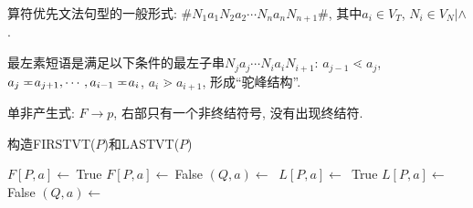                算符优先文法句型的一般形式: $\#N_1a_1N_2a_2\cdots N_na_nN_{n+1}\#$, 其中$a_i\in V_T$, $N_i\in V_N|\wedge$.

                \textsf{最左素短语}是满足以下条件的最左子串$N_ja_j\cdots N_ia_iN_{i+1}$: $a_{j-1}\lessdot a_j$, $a_j=\hskip -.8em\cdot\  a_{j+1}, \cdots, \\a_{i-1}=\hskip -.8em\cdot\  a_i$, $a_i\gtrdot a_{i+1}$, 形成``驼峰结构''.


                \textsf{单非产生式}: $F\to p$, 右部只有一个非终结符号, 没有出现终结符.

            \begin{algorithm}
                \caption{构造FIRSTVT($P$)和LASTVT($P$)}
                \label{algorithm-firstvt-lastvt}
                \begin{algorithmic}[1]
                            \State $F[P,a]\gets\ $True
                            \State {}
                        \EndIf
                    \EndProcedure
                            \State $F[P,a]\gets\ $False
                        \EndFor
                            \State {}
                        \EndFor
                            \State $(Q, a)\gets\ $
                                \State {}
                            \EndFor
                        \EndWhile
                    \EndProcedure
                    \State
                            \State $L[P,a]\gets$\ True
                            \State {}
                        \EndIf
                    \EndProcedure
                            \State $L[P,a]\gets\ $False
                        \EndFor
                            \State {}
                        \EndFor
                            \State $(Q, a)\gets\ $
                                \State {}
                            \EndFor
                        \EndWhile
                    \EndProcedure
                \end{algorithmic}
            \end{algorithm}

